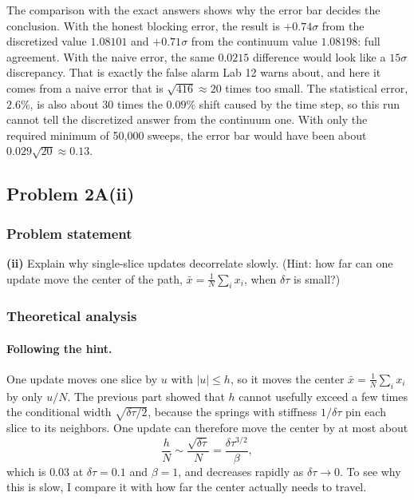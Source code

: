 \documentclass[11pt]{article}
\numberwithin{equation}{section}
\begin{document}
The comparison with the exact answers shows why the error bar decides the conclusion. With the honest blocking error, the result is $+0.74\sigma$ from the discretized value $1.08101$ and $+0.71\sigma$ from the continuum value $1.08198$: full agreement. With the naive error, the same $0.0215$ difference would look like a $15\sigma$ discrepancy. That is exactly the false alarm Lab 12 warns about, and here it comes from a naive error that is $\sqrt{416}\approx20$ times too small. The statistical error, $2.6\%$, is also about 30 times the $0.09\%$ shift caused by the time step, so this run cannot tell the discretized answer from the continuum one. With only the required minimum of 50{,}000 sweeps, the error bar would have been about $0.029\sqrt{20}\approx0.13$.

\subsection{Problem 2A(ii)}

\subsubsection*{Problem statement}
\begin{statement}
\textbf{(ii)} Explain why single-slice updates decorrelate slowly. (Hint: how far can one update move the center of the path, $\bar x=\frac1N\sum_ix_i$, when $\delta\tau$ is small?)
\end{statement}

\subsubsection*{Theoretical analysis}

\paragraph{Following the hint.}
One update moves one slice by $u$ with $|u|\le h$, so it moves the center $\bar x=\frac1N\sum_ix_i$ by only $u/N$. The previous part showed that $h$ cannot usefully exceed a few times the conditional width $\sqrt{\delta\tau/2}$, because the springs with stiffness $1/\delta\tau$ pin each slice to its neighbors. One update can therefore move the center by at most about
\begin{equation}
\frac{h}{N}\sim\frac{\sqrt{\delta\tau}}{N}=\frac{\delta\tau^{3/2}}{\beta},
\end{equation}
which is $0.03$ at $\delta\tau=0.1$ and $\beta=1$, and decreases rapidly as $\delta\tau\to0$. To see why this is slow, I compare it with how far the center actually needs to travel.
\end{document}
